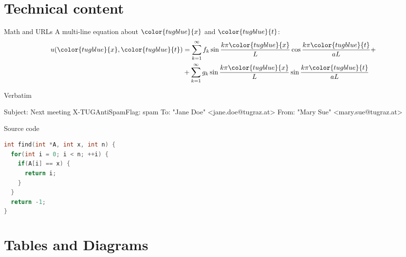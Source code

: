 \documentclass[table, aspectratio=169]{beamer}
\begin{document}

\section{Technical content}

\newcommand{\blue}[1]{{\color{tugblue}{#1}}}
\begin{frame}{Math and URLs}
  A multi-line equation about $\blue{x}$ and $\blue{t}$:
	\begin{align*}
    u(\blue{x},\blue{t}) &= \sum_{k=1}^{\infty} f_k \sin \frac{k \pi \blue{x}}{L} \cos \frac{k \pi \blue{t}}{aL} + \\
                         & + \sum_{k=1}^{\infty} g_k \sin \frac{k \pi \blue{x}}{L} \sin \frac{k \pi \blue{t}}{aL}
	\end{align*}
\end{frame}

\begin{frame}[fragile]{Verbatim}
	\begin{semiverbatim}
Subject: Next meeting
\alert{X-TUGAntiSpamFlag: spam}
To: "Jane Doe" <jane.doe@tugraz.at>
From: "Mary Sue" <mary.sue@tugraz.at>
	\end{semiverbatim}
\end{frame}

\begin{frame}[fragile]{Source code}
  \begin{lstlisting}[language=C,basicstyle=\ttfamily]
int find(int *A, int x, int n) {
  for(int i = 0; i < n; ++i) {
    if(A[i] == x) {
      return i;
    }
  }
  return -1;
}
  \end{lstlisting}
\end{frame}

\section{Tables and Diagrams}
\end{document}
